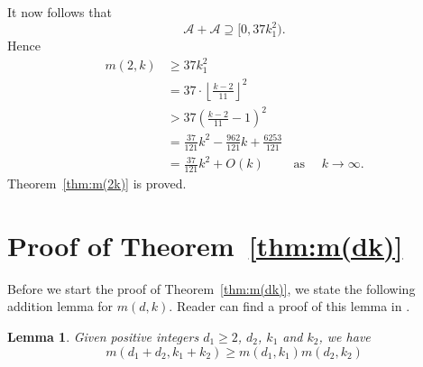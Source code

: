 \documentclass[11pt]{article}
\newtheorem{lemma}{Lemma}[section]
\theoremstyle{definition}
\begin{document}
It now follows that 
\[
\mathscr{A} + \mathscr{A} \supseteq [0, 37k_1^2).
\]
Hence
\begin{align*}
m(2,k) &\geq 37k_1^2\\
&= 37 \cdot \left \lfloor \frac{k - 2}{11}\right \rfloor^2\\
&> 37 \left(\frac{k - 2}{11} -1\right) ^2\\
&= \frac{37}{121}k^2-\frac{962}{121}k+\frac{6253}{121}\\
&= \frac{37}{121}k^2 + O(k)\qquad \text{ as }\quad k \to \infty. 
\end{align*}
Theorem~\ref{thm:m(2k)} is proved.




\section{Proof of Theorem~\ref{thm:m(dk)}}

Before we start the proof of Theorem~\ref{thm:m(dk)}, we state the following addition lemma for $m(d,k)$. Reader can find a proof of this lemma in \cite{Hsu-Jia:CombinatorialNetworks}.

\begin{lemma}\label{lemma:addition}
Given positive integers $d_{1} \ge2$, $d_{2}$, $k_{1}$ and $k_{2}$, we have
\[
m(d_1+d_2,k_1+k_2) \geq m(d_1,k_1)m(d_2,k_2) 
\]
\end{lemma}
\end{document}

